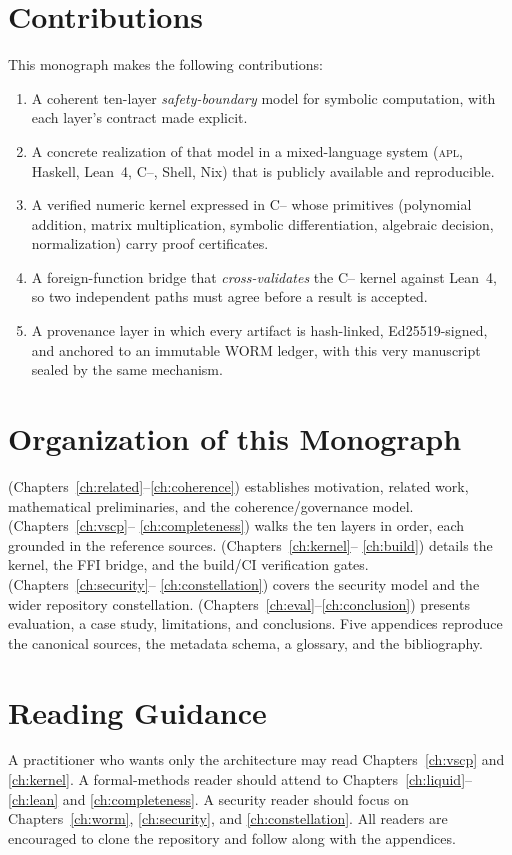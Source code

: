 \section{Contributions}
\label{sec:intro-contributions}

This monograph makes the following contributions:
\begin{enumerate}[label=(\arabic*)]
  \item A coherent ten-layer \emph{safety-boundary} model for symbolic
        computation, with each layer's contract made explicit.
  \item A concrete realization of that model in a mixed-language system
        (\textsc{apl}, Haskell, Lean~4, C{--}, Shell, Nix) that is
        publicly available and reproducible.
  \item A verified numeric kernel expressed in C{--} whose primitives
        (polynomial addition, matrix multiplication, symbolic
        differentiation, algebraic decision, normalization) carry proof
        certificates.
  \item A foreign-function bridge that \emph{cross-validates} the C{--}
        kernel against Lean~4, so two independent paths must agree before a
        result is accepted.
  \item A provenance layer in which every artifact is hash-linked,
        Ed25519-signed, and anchored to an immutable WORM ledger, with this
        very manuscript sealed by the same mechanism.
\end{enumerate}

\section{Organization of this Monograph}
\label{sec:intro-org}

 (Chapters~\ref{ch:related}--\ref{ch:coherence})
establishes motivation, related work, mathematical preliminaries, and the
coherence/governance model.  (Chapters~\ref{ch:vscp}--
\ref{ch:completeness}) walks the ten layers in order, each grounded in the
reference sources.  (Chapters~\ref{ch:kernel}--
\ref{ch:build}) details the kernel, the FFI bridge, and the build/CI
verification gates.  (Chapters~\ref{ch:security}--
\ref{ch:constellation}) covers the security model and the wider repository
constellation.  (Chapters~\ref{ch:eval}--\ref{ch:conclusion})
presents evaluation, a case study, limitations, and conclusions. Five
appendices reproduce the canonical sources, the metadata schema, a glossary,
and the bibliography.

\section{Reading Guidance}
\label{sec:intro-reading}

A practitioner who wants only the architecture may read
Chapters~\ref{ch:vscp} and \ref{ch:kernel}. A formal-methods reader should
attend to Chapters~\ref{ch:liquid}--\ref{ch:lean} and \ref{ch:completeness}.
A security reader should focus on Chapters~\ref{ch:worm}, \ref{ch:security},
and \ref{ch:constellation}. All readers are encouraged to clone the
repository and follow along with the appendices.
